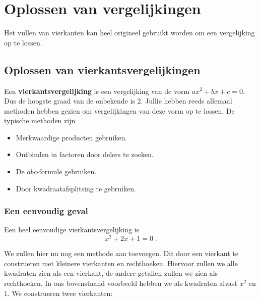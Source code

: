 
\section{Oplossen van vergelijkingen}

Het vullen van vierkanten kan heel origineel gebruikt worden om een vergelijking op te lossen. 

\subsection{Oplossen van vierkantsvergelijkingen}

Een {\bf vierkantsvergelijking} is een vergelijking van de vorm $ax^2 + bx + c = 0$. Dus de hoogste graad van de onbekende is $2$. Jullie hebben reeds allemaal methoden hebben gezien om vergelijkingen van deze vorm op te lossen. De typische methoden zijn
\begin{itemize}
  \item Merkwaardige producten gebruiken.
  \item Ontbinden in factoren door delers te zoeken.
  \item De $abc$-formule gebruiken.
  \item Door kwadraatafsplitsing te gebruiken.
\end{itemize}


\answer[1cm]{}

\subsubsection{Een eenvoudig geval}

Een heel eenvoudige vierkantsvergelijking is
$$
x^2+2x+1=0\;.
$$



We zullen hier nu nog een methode aan toevoegen. Dit door een vierkant te construeren met kleinere vierkanten en rechthoeken. Hiervoor zullen we alle kwadraten zien als een vierkant, de andere getallen zullen we zien als rechthoeken. In ons bovenstaand voorbeeld hebben we als kwadraten alvast $x^2$ en $1$. We construeren twee vierkanten:

